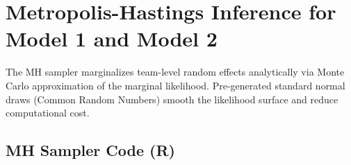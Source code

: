 \documentclass[11pt]{article}
\begin{document}

\newpage
\appendix


\section{Metropolis-Hastings Inference for Model 1 and Model 2}\label{app:mh}

The MH sampler marginalizes team-level random effects analytically via Monte Carlo approximation of the marginal likelihood. Pre-generated standard normal draws (Common Random Numbers) smooth the likelihood surface and reduce computational cost.

\subsection{MH Sampler Code (R)}
\end{document}
